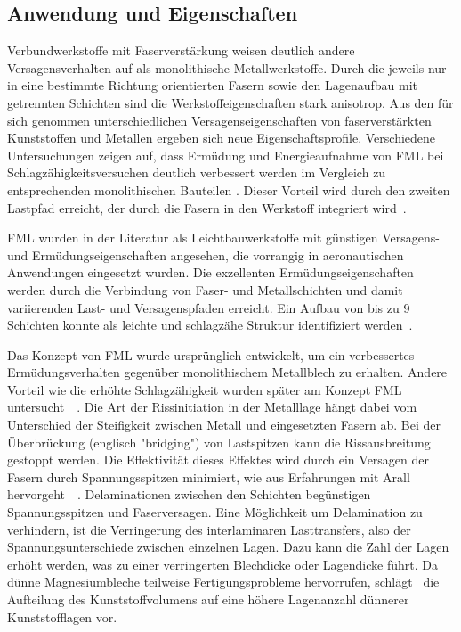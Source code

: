 \subsection{Anwendung und Eigenschaften}\label{subsec:anwendung}

Verbundwerkstoffe mit Faserverstärkung weisen deutlich andere Versagensverhalten auf als monolithische Metallwerkstoffe.
Durch die jeweils nur in eine bestimmte Richtung orientierten Fasern sowie den Lagenaufbau mit getrennten Schichten sind die Werkstoffeigenschaften stark anisotrop.
Aus den für sich genommen unterschiedlichen Versagenseigenschaften von faserverstärkten Kunststoffen und Metallen ergeben sich neue Eigenschaftsprofile.
Verschiedene Untersuchungen zeigen auf, dass Ermüdung und Energieaufnahme von FML bei Schlagzähigkeitsversuchen deutlich verbessert werden im Vergleich zu entsprechenden monolithischen Bauteilen \cite{Cortes.2005,Botelho.2006}.
Dieser Vorteil wird durch den zweiten Lastpfad erreicht, der durch die Fasern in den Werkstoff integriert wird~\cite{Beumler.2004}.

FML wurden in der Literatur als Leichtbauwerkstoffe mit günstigen Versagens- und Ermüdungseigenschaften angesehen, die vorrangig in aeronautischen Anwendungen eingesetzt wurden.
Die exzellenten Ermüdungseigenschaften werden durch die Verbindung von Faser- und Metallschichten und damit variierenden Last- und Versagenspfaden erreicht.
Ein Aufbau von bis zu 9 Schichten konnte als leichte und schlagzähe Struktur identifiziert werden~\cite{Parnanen.2012}.

Das Konzept von FML wurde ursprünglich entwickelt, um ein verbessertes Ermüdungsverhalten gegenüber monolithischem Metallblech zu erhalten.
Andere Vorteil wie die erhöhte Schlagzähigkeit wurden später am Konzept FML untersucht~\cite{Alderliesten.2008}~.
Die Art der Rissinitiation in der Metalllage hängt dabei vom Unterschied der Steifigkeit zwischen Metall und eingesetzten Fasern ab.
Bei der Überbrückung (englisch "bridging") von Lastspitzen kann die Rissausbreitung gestoppt werden.
Die Effektivität dieses Effektes wird durch ein Versagen der Fasern durch Spannungsspitzen minimiert, wie aus Erfahrungen mit Arall hervorgeht~\cite{Marissen.1988}~.
Delaminationen zwischen den Schichten begünstigen Spannungsspitzen und Faserversagen.
Eine Möglichkeit um Delamination zu verhindern, ist die Verringerung des interlaminaren Lasttransfers, also der Spannungsunterschiede zwischen einzelnen Lagen.
Dazu kann die Zahl der Lagen erhöht werden, was zu einer verringerten Blechdicke oder Lagendicke führt.
Da dünne Magnesiumbleche teilweise Fertigungsprobleme hervorrufen, schlägt~\cite{Alderliesten.2008} die Aufteilung des Kunststoffvolumens auf eine höhere Lagenanzahl dünnerer Kunststofflagen vor.

